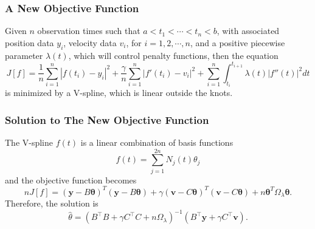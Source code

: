 \documentclass{beamer}
\begin{document}
\begin{frame}
\frametitle{A New Objective Function}
Given $n$ observation times such that $a<t_1<\cdots <t_n<b$, with associated position data $y_i$, velocity data $v_i$, for $i=1,2,\cdots,n$, and a positive piecewise parameter $\lambda(t)$, which will control penalty functions, then the equation
\begin{equation}\label{obtractor}
J[f]=\frac{1}{n}\sum_{i=1}^n|f(t_i)-y_i|^2+\frac{\gamma}{n}\sum_{i=1}^{n}|f'(t_i)-v_i|^2+\sum_{i=1}^n\int_{t_i}^{t_{i+1}}\lambda(t)|f''(t)|^2 dt
\end{equation}
is minimized by a V-spline, which is linear outside the knots. 
\end{frame}


\begin{frame}
\frametitle{Solution to The New Objective Function}
The V-spline $f(t)$ is a linear combination of basis functions
\begin{equation}
f(t)=\sum_{j=1}^{2n} N_j(t)\theta_j 
\end{equation}
and the objective function becomes 
\begin{equation}
nJ[f]=(\mathbf{y}-B\mathbf{\theta})^T(\mathbf{y}-B\mathbf{\theta})+\gamma(\mathbf{v}-C\mathbf{\theta})^T(\mathbf{v}-C\mathbf{\theta})+n\mathbf{\theta}^T\Omega_\lambda\mathbf{\theta}.
\end{equation}
Therefore, the solution is 
\begin{equation}
\hat{\theta}=\left(B^\top B+\gamma C^\top C+n\Omega_\lambda\right)^{-1}\left(B^\top\mathbf{y}+\gamma C^\top\mathbf{v}\right)\label{thetahat}.
\end{equation}


\end{frame}


\end{document}

